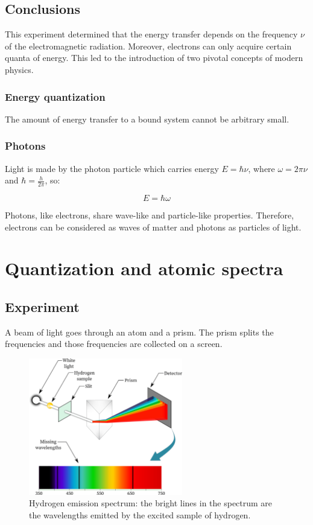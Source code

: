   \subsection{Conclusions}
  This experiment determined that the energy transfer depends on the frequency $\nu$ of the electromagnetic radiation.
  Moreover, electrons can only acquire certain quanta of energy.
  This led to the introduction of two pivotal concepts of modern physics.

    \subsubsection{Energy quantization}
    The amount of energy transfer to a bound system cannot be arbitrary small.

    \subsubsection{Photons}
    Light is made by the photon particle which carries energy $E = \hbar\nu$, where $\omega = 2\pi\nu$ and $\hbar = \frac{h}{2\pi}$, so:

    $$E = \hbar\omega$$

    Photons, like electrons, share wave-like and particle-like properties.
    Therefore, electrons can be considered as waves of matter and photons as particles of light.

\section{Quantization and atomic spectra}

  \subsection{Experiment}
  A beam of light goes through an atom and a prism.
  The prism splits the frequencies and those frequencies are collected on a screen.
\begin{figure}[h!]
    \centering
    \includegraphics[clip, width=0.6\textwidth]{quantization.png}
    \caption{\label{fig:quantization} Hydrogen emission spectrum: the bright lines in the spectrum are the wavelengths emitted by the excited sample of hydrogen.}
\end{figure}
